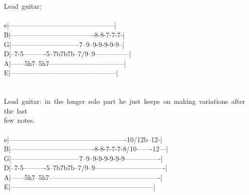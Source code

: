 {\\
\\
Lead\ guitar:\\
\\
e|-----------------------------------------------|\\
B|-------------------------------------8-8-7-7-7-|\\
G|------------------------------7--9--9-9-9-9-9--|\\
D|--7-5----------5--7b7b7b--7/9--9---------------|\\
A|------5h7--5h7---------------------------------|\\
E|-----------------------------------------------|\\
\\
\\
Lead\ guitar:\ in\ the\ longer\ solo\ part\ he\ just\ keeps\ on\ making\ variations\ after\ the\ last\ \\
few\ notes.\\
\\
e|----------------------------------------------------10/12b--12-|\\
B|-------------------------------------8-8-7-7-7-8/10-------12---|\\
G|------------------------------7--9--9-9-9-9-9-9----------------|\\
D|--7-5----------5--7b7b7b--7/9--9-------------------------------|\\
A|------5h7--5h7-------------------------------------------------|\\
E|---------------------------------------------------------------|\\
\\
\\
\\}
